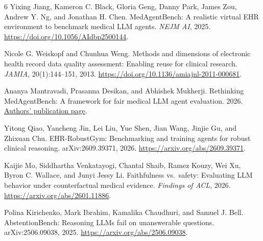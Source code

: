 \documentclass{article}
\begin{document}
\begin{thebibliography}{6}
\small
{}
Yixing Jiang, Kameron C. Black, Gloria Geng, Danny Park, James Zou, Andrew Y. Ng, and Jonathan H. Chen.
MedAgentBench: A realistic virtual EHR environment to benchmark medical LLM agents.
\emph{NEJM AI}, 2025. \url{https://doi.org/10.1056/AIdbp2500144}.

Nicole G. Weiskopf and Chunhua Weng.
Methods and dimensions of electronic health record data quality assessment: Enabling reuse for clinical research.
\emph{JAMIA}, 20(1):144--151, 2013. \url{https://doi.org/10.1136/amiajnl-2011-000681}.

Ananya Mantravadi, Prasanna Desikan, and Abhishek Mukherji.
Rethinking MedAgentBench: A framework for fair medical LLM agent evaluation.
2026. \href{https://www.centific.com/publications/rethinking-medagentbench-a-framework-for-fair-medical-llm-agent-evaluation}{Authors' publication page}.

Yitong Qiao, Yancheng Jin, Lei Liu, Yue Shen, Jian Wang, Jinjie Gu, and Zhixuan Chu.
EHR-RobustGym: Benchmarking and training agents for robust clinical reasoning.
arXiv:2609.39371, 2026. \url{https://arxiv.org/abs/2609.39371}.

Kaijie Mo, Siddhartha Venkatayogi, Chantal Shaib, Ramez Kouzy, Wei Xu, Byron C. Wallace, and Junyi Jessy Li.
Faithfulness vs.\ safety: Evaluating LLM behavior under counterfactual medical evidence.
\emph{Findings of ACL}, 2026. \url{https://arxiv.org/abs/2601.11886}.

Polina Kirichenko, Mark Ibrahim, Kamalika Chaudhuri, and Samuel J. Bell.
AbstentionBench: Reasoning LLMs fail on unanswerable questions.
arXiv:2506.09038, 2025. \url{https://arxiv.org/abs/2506.09038}.
\end{thebibliography}
\end{document}
